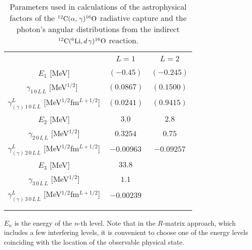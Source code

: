 \documentclass[prl,unsortedaddress,groupedaddress,twocolumn,amsmath,amsfonts,amssymb,showpacs,floatfix,nofootinbib]{revtex4}
\begin{document}
\begin{table}
\begin{center}
\caption{Parameters used in calculations of the astrophysical factors of the ${}^{12}{\rm C}(\alpha,\,\gamma){}^{16}{\rm O}$ radiative capture and the photon's angular distributions from the indirect ${}^{12}{\rm C}({}^{6}{\rm Li}, d\,\gamma){}^{16}{\rm O}$ reaction.}
\vspace{0.4cm}
\begin{tabular}[t]{c c c}
\hline \hline \\
 &  $L=1$ &  $L=2$  \\[2mm]
\hline\\[1mm]
$E_{1}$ [MeV] & $(-0.45)$ &  $(-0.245)$   \\[1ex]
 $\gamma_{1\,0\,L\,L}$ [MeV$^{1/2}$]\,\,\, & $(0.0867)$ & $(0.1500)$  \\[1ex] 
  $\gamma_{(\gamma)\,1\,0\,L\,L}^{L}$ [MeV${}^{1/2}$fm${}^{L+1/2}$] & $(0.0241)$ & $(0.9415)$  \\[1ex]
    $E_{2}$ [MeV] & $3.0$ & $2.8$  \\[1ex]
   $\gamma_{2\,0\,L\,L}$ [MeV$^{1/2}$] & $0.3254$ & $0.75$  \\[1ex]
$\gamma_{(\gamma)\,2\,0\,L\,L}^{L}$ [MeV${}^{1/2}$fm${}^{L+1/2}$]  & $-0.00963$ & $-0.09257$  \\[1ex]
$E_{3}$ [MeV] & $33.8$ &   \\ [1ex]  
$\gamma_{3\,0\,L\,L}$ [MeV$^{1/2}$]  & $1.1$ &  \\[1ex]
$\gamma_{(\gamma)\,3\,0\,L\,L}^{L}$ [MeV${}^{1/2}$fm${}^{L+1/2}$] & $-0.00239$ &  \\[2mm]
\hline \hline \\
\label{table_parameters}
\end{tabular}
\end{center}
\end{table}
$E_{n}$ is the energy of the $n$-th level. 
Note that in the $R$-matrix approach, which includes a few interfering levels, it is convenient to choose one of the energy levels coinciding with the location of the observable physical state. 
\end{document}
